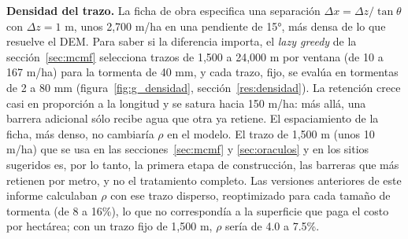 \documentclass[11pt,letterpaper]{article}
\begin{document}
\textbf{Densidad del trazo.} La ficha de obra especifica una separación $\Delta x=\Delta z/\tan\theta$ con $\Delta z=1$ m, unos 2,700 m/ha en una pendiente de 15°, más densa de lo que resuelve el DEM. Para saber si la diferencia importa, el \emph{lazy greedy} de la sección~\ref{sec:mcmf} selecciona trazos de 1,500 a 24,000 m por ventana (de 10 a 167 m/ha) para la tormenta de 40 mm, y cada trazo, fijo, se evalúa en tormentas de 2 a 80 mm (figura~\ref{fig:g_densidad}, sección~\ref{res:densidad}). La retención crece casi en proporción a la longitud y se satura hacia 150 m/ha: más allá, una barrera adicional sólo recibe agua que otra ya retiene. El espaciamiento de la ficha, más denso, no cambiaría $\rho$ en el modelo. El trazo de 1,500 m (unos 10 m/ha) que se usa en las secciones~\ref{sec:mcmf} y \ref{sec:oraculos} y en los sitios sugeridos es, por lo tanto, la primera etapa de construcción, las barreras que más retienen por metro, y no el tratamiento completo. Las versiones anteriores de este informe calculaban $\rho$ con ese trazo disperso, reoptimizado para cada tamaño de tormenta (de 8 a 16\%), lo que no correspondía a la superficie que paga el costo por hectárea; con un trazo fijo de 1,500 m, $\rho$ sería de 4.0 a 7.5\%.
\end{document}
